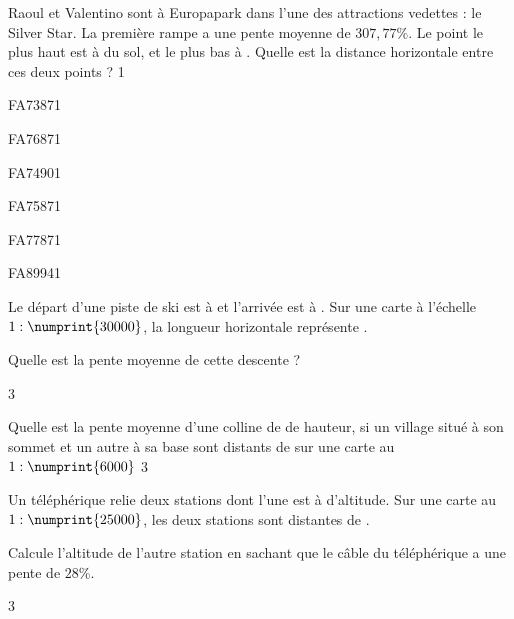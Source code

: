 \documentclass[a4paper,11pt]{report}
\begin{document}
\begin{exo}{
Raoul et Valentino sont à Europapark dans l'une des attractions vedettes : le Silver Star. La première rampe a une pente moyenne de $307,77\%$. Le point le plus haut est à  du sol, et le plus bas à .
Quelle est la distance horizontale entre ces deux points ?
}{1}
\end{exo}

\begin{exol}{FA73}{87}{1} %
\end{exol}

\begin{exol}{FA76}{87}{1} %
\end{exol}

\begin{exof}{FA74}{90}{1} %
\end{exof}

\begin{exol}{FA75}{87}{1} %
\end{exol}

\begin{exol}{FA77}{87}{1}
\end{exol}


\begin{exof}{FA89}{94}{1} %
\end{exof}

\begin{exo}{
    Le départ d'une piste de ski est à  et l'arrivée est à . Sur une carte à l'échelle $1:\numprint{30000}$, la longueur horizontale représente .

    Quelle est la pente moyenne de cette descente ?
}{3}
\end{exo}


\begin{exo}{
Quelle est la pente moyenne d'une colline de  de hauteur, si un village situé à son sommet et un autre à sa base sont distants de  sur une carte au $1:\numprint{6000}$
}{3}
\end{exo}


\begin{exo}{
Un téléphérique relie deux stations dont l'une est à  d'altitude. Sur une carte au $1:\numprint{25000}$, les deux stations sont distantes de .

Calcule l'altitude de l'autre station en sachant que le câble du téléphérique a une pente de $28\%$.
}{3}
\end{exo}
\end{document}
